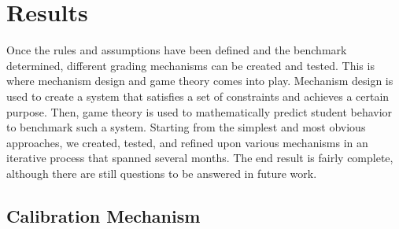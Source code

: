 \documentclass[12pt, Arial]{article}
\begin{document}
\section{Results}
Once the rules and assumptions have been defined and the benchmark determined, different grading mechanisms can be created and tested. This is where mechanism design and game theory comes into play. Mechanism design is used to create a system that satisfies a set of constraints and achieves a certain purpose. Then, game theory is used to mathematically predict student behavior to benchmark such a system. Starting from the simplest and most obvious approaches, we created, tested, and refined upon various mechanisms in an iterative process that spanned several months. The end result is fairly complete, although there are still questions to be answered in future work.

\subsection{Calibration Mechanism}
\label{sec:calibration}
\end{document}
